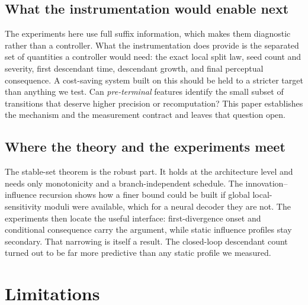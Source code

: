\documentclass[11pt,a4paper]{article}
\theoremstyle{plain}
\theoremstyle{definition}
\theoremstyle{remark}
\begin{document}
\subsection{What the instrumentation would enable next}
\label{sec:controller}
The experiments here use full suffix information, which makes them diagnostic
rather than a controller. What the instrumentation does provide is the separated
set of quantities a controller would need: the exact local split law, seed count
and severity, first descendant time, descendant growth, and final perceptual
consequence. A cost-saving system built on this should be held to a stricter
target than anything we test. Can \emph{pre-terminal} features identify the small
subset of transitions that deserve higher precision or recomputation? This paper
establishes the mechanism and the measurement contract and leaves that question
open.

\subsection{Where the theory and the experiments meet}
The stable-set theorem is the robust part. It holds at the architecture level and
needs only monotonicity and a branch-independent schedule. The
innovation--influence recursion shows how a finer bound could be built if global
local-sensitivity moduli were available, which for a neural decoder they are not.
The experiments then locate the useful interface: first-divergence onset and
conditional consequence carry the argument, while static influence profiles stay
secondary. That narrowing is itself a result. The closed-loop descendant count
turned out to be far more predictive than any static profile we measured.

\section{Limitations}
\end{document}

